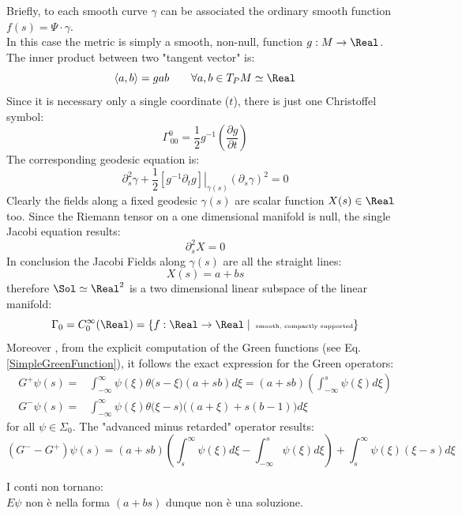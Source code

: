 \documentclass[Main]{subfiles}
\begin{document}
		Briefly, to each smooth curve $\gamma$ can be associated the ordinary smooth function $f(s) = \Psi \cdot \gamma$.\\
		In this case the metric is simply a smooth, non-null, function $g: M \rightarrow \Real$. The inner product between two "tangent vector" is:
		\begin{displaymath}
			\left< a , b \right> = g a b \qquad \forall a,b \in T_P M \simeq \Real
		\end{displaymath}
		Since it is necessary only a single coordinate ($t$), there is just one Christoffel symbol:
		\begin{displaymath}
			\Gamma^0_{\, 0 0} = \frac{1}{2} g^{-1} \left( \frac{\partial g}{\partial t} \right)
		\end{displaymath}
		The corresponding geodesic equation is:
		\begin{displaymath}
			\partial^2_s \gamma + \frac{1}{2}\left.\left[ g^{-1}  \partial_t g \right] \right\vert_{\gamma(s)}  \left(\partial_s\gamma\right) ^2 = 0
		\end{displaymath}
		Clearly the fields along a fixed geodesic $\gamma(s)$ are scalar function $X(s) \in \Real$ too.
		Since the Riemann tensor on a one dimensional manifold is null, the single Jacobi equation results:
		\begin{displaymath}
			\partial_s^2 X = 0
		\end{displaymath}
		In conclusion the Jacobi Fields along $\gamma(s)$ are all the straight lines:
		\begin{displaymath}
			X(s) = a + b s
		\end{displaymath}
		therefore $\Sol \simeq \Real^2$ is a two dimensional linear subspace of the linear manifold:
		\begin{displaymath}
			\Gamma_0 = C_0^\infty (\Real) = \{ f: \Real \rightarrow \Real \; \vert \, \textrm{ \tiny smooth, compactly supported}\}
		\end{displaymath}
		Moreover , from the explicit computation of the Green functions (see Eq. \ref{SimpleGreenFunction}), it follows the exact expression for the Green operators:
		\begin{align*}
			G^+ \psi (s) =& \int_{-\infty}^\infty \psi(\xi) \theta\big( s-\xi \big) \left( a + s b \right) d\xi 
			=  \left( a + s b \right) \left(\int_{-\infty}^{s}  \psi(\xi) d\xi\right)	\\
			G^- \psi (s)=& \int_{-\infty}^\infty \psi(\xi) \theta\big( \xi -s \big) \big( (a + \xi)  + s ( b  - 1) \big) d\xi 
		\end{align*}
		for all  $\psi \in \Sigma_0$.
		The "advanced minus retarded" operator results:
		\begin{displaymath}
			( G^- -  G^+ ) \psi(s) =  \left( a + s b \right) \left(\int_{s}^{\infty} \psi(\xi) d\xi - \int_{-\infty}^{s} \psi(\xi) d\xi \right) + \int_{s}^{\infty} \psi(\xi) ( \xi -s) d\xi
		\end{displaymath}
		\begin{Warning}
			I conti non tornano:\\  $E \psi$ non è nella forma $(a +b s)$ dunque non è una soluzione.
		\end{Warning}
\end{document}
